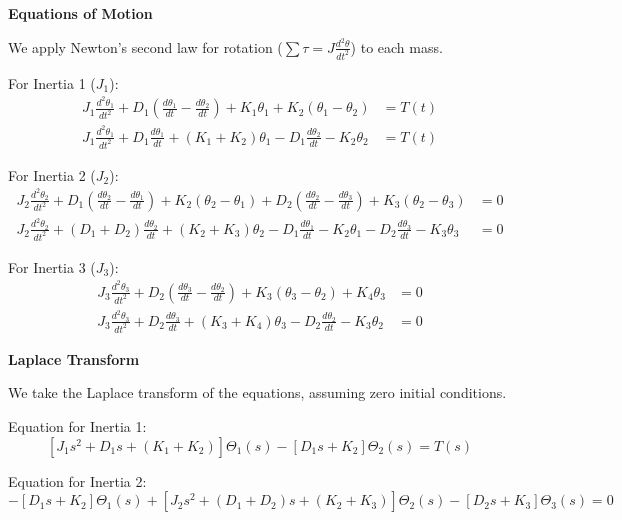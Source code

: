 \documentclass[11pt]{article}
\begin{document}
\noindent\textbf{Equations of Motion}

\vspace{8pt}

\noindent We apply Newton's second law for rotation ($\sum \tau = J \frac{d^2\theta}{dt^2}$) to each mass.

\vspace{8pt}

{For Inertia 1 ($J_1$):}
\begin{align*}
    J_1 \frac{d^2\theta_1}{dt^2} + D_1\left(\frac{d\theta_1}{dt} - \frac{d\theta_2}{dt}\right) + K_1 \theta_1 + K_2(\theta_1 - \theta_2) &= T(t) \\
    J_1 \frac{d^2\theta_1}{dt^2} + D_1\frac{d\theta_1}{dt} + (K_1 + K_2)\theta_1 - D_1\frac{d\theta_2}{dt} - K_2\theta_2 &= T(t)
\end{align*}

{For Inertia 2 ($J_2$):}
\begin{align*}
    J_2 \frac{d^2\theta_2}{dt^2} + D_1\left(\frac{d\theta_2}{dt} - \frac{d\theta_1}{dt}\right) + K_2(\theta_2 - \theta_1) + D_2\left(\frac{d\theta_2}{dt} - \frac{d\theta_3}{dt}\right) + K_3(\theta_2 - \theta_3) &= 0 \\
    J_2 \frac{d^2\theta_2}{dt^2} + (D_1 + D_2)\frac{d\theta_2}{dt} + (K_2 + K_3)\theta_2 - D_1\frac{d\theta_1}{dt} - K_2\theta_1 - D_2\frac{d\theta_3}{dt} - K_3\theta_3 &= 0
\end{align*}

{For Inertia 3 ($J_3$):}
\begin{align*}
    J_3 \frac{d^2\theta_3}{dt^2} + D_2\left(\frac{d\theta_3}{dt} - \frac{d\theta_2}{dt}\right) + K_3(\theta_3 - \theta_2) + K_4\theta_3 &= 0 \\
    J_3 \frac{d^2\theta_3}{dt^2} + D_2\frac{d\theta_3}{dt} + (K_3 + K_4)\theta_3 - D_2\frac{d\theta_2}{dt} - K_3\theta_2 &= 0
\end{align*}

\newpage
\noindent\textbf{Laplace Transform}

\vspace{12pt}

We take the Laplace transform of the equations, assuming zero initial conditions.

\vspace{8pt}

Equation for Inertia 1:
\[
[J_1 s^2 + D_1 s + (K_1 + K_2)]\Theta_1(s) - [D_1s + K_2]\Theta_2(s) = T(s)
\]

Equation for Inertia 2:
\[
-[D_1s + K_2]\Theta_1(s) + [J_2 s^2 + (D_1 + D_2)s + (K_2 + K_3)]\Theta_2(s) - [D_2s + K_3]\Theta_3(s) = 0
\]
\end{document}
